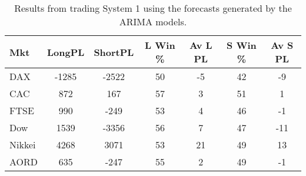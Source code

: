 \begin{table}[ht]
\centering
\caption[Results from trading System 1 using the forecasts generated by the ARIMA models]{Results from trading System 1 using the forecasts generated by the ARIMA models.} 
\label{tab:chp_ts:arima1}
\begin{tabular}{lcccccc}
  \toprule Mkt & LongPL & ShortPL & L Win \% & Av L PL & S Win \% & Av S PL \\ 
  \midrule DAX & -1285 & -2522 & 50 & -5 & 42 & -9 \\ 
  CAC & 872 & 167 & 57 & 3 & 51 & 1 \\ 
  FTSE & 990 & -249 & 53 & 4 & 46 & -1 \\ 
  Dow & 1539 & -3356 & 56 & 7 & 47 & -11 \\ 
  Nikkei & 4268 & 3071 & 53 & 21 & 49 & 13 \\ 
  AORD & 635 & -247 & 55 & 2 & 49 & -1 \\ 
   \bottomrule \end{tabular}
\end{table}
